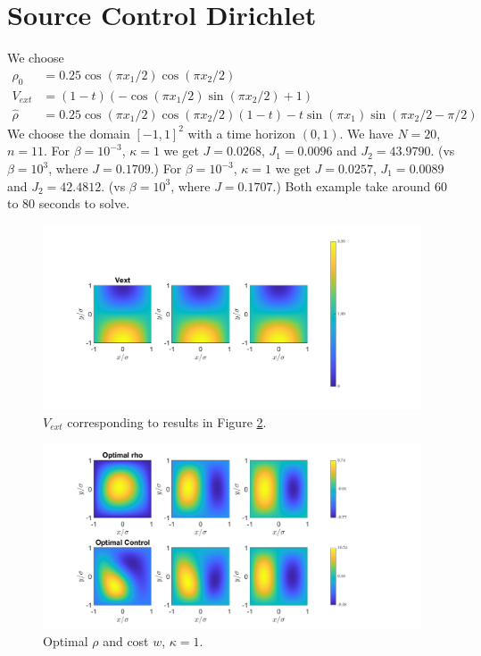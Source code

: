 \documentclass[11pt, a4paper]{article}
\theoremstyle{definition}
\newcommand{\hr}{\widehat \rho}
\begin{document}
	\section*{Source Control Dirichlet}
		We choose 
	\begin{align*}
		\rho_0 &= 0.25\cos(\pi x_1/2)\cos(\pi x_2/2)\\
		V_{ext} &=  (1-t)(-\cos(\pi x_1/2)\sin(\pi x_2/2) + 1)\\
		\hr &= 0.25\cos(\pi x_1/2)\cos(\pi x_2/2)(1 - t) - t\sin(\pi x_1)\sin(\pi x_2/2 - \pi/2)
	\end{align*}
	We choose the domain $[-1,1]^2$ with a time horizon $(0,1)$. We have $N = 20$, $n = 11$. 
	For $\beta = 10^{-3}$, $\kappa =1$ we get $J = 0.0268$, $J_1 = 0.0096$ and $J_2 = 43.9790$. (vs $\beta = 10^3$, where $J = 0.1709$.)
	For $\beta = 10^{-3}$, $\kappa =1$ we get $J = 0.0257$, $J_1 = 0.0089$ and $J_2 = 42.4812$. (vs $\beta = 10^3$, where $J = 0.1707$.) Both example take around $60$ to $80$ seconds to solve.
	\begin{figure}[h]
		\centering
		\includegraphics[scale=0.35]{VextEx2.png}
		\caption{$V_{ext}$ corresponding to results in Figure \ref{F2}.} 
		\label{F2a}
	\end{figure}
	\begin{figure}[h]
		\centering
		\includegraphics[scale=0.35]{SCEx2k1V.png}
		\caption{Optimal $\rho$ and cost $w$, $\kappa = 1$.} 
		\label{F2}
	\end{figure}
\end{document}
